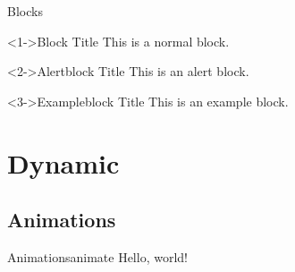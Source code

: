 \documentclass[xcolor=table]{beamer}
\begin{document}
    \begin{frame}{Blocks}
        \begin{block}<1->{Block Title}
            This is a normal block.
        \end{block}

        \begin{alertblock}<2->{Alertblock Title}
            This is an alert block.
        \end{alertblock}

        \begin{exampleblock}<3->{Exampleblock Title}
            This is an example block.
        \end{exampleblock}
    \end{frame}

    \section{Dynamic}
    \subsection{Animations}
    \newdimen\xoffset
    \begin{frame}{Animations}{animate}
        \hspace{\xoffset} Hello, world!
    \end{frame}
\end{document}

